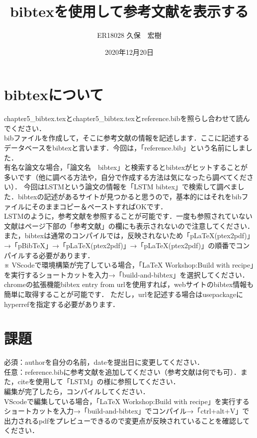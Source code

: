\documentclass[a4paper,10pt]{jsarticle}
\title{bibtexを使用して参考文献を表示する}%
\author{ER18028 久保　宏樹}%
\date{2020年12月20日}%
\begin{document}
\maketitle%
\section{bibtexについて}
chapter5\_bibtex.texとchapter5\_bibtex.texとreference.bibを照らし合わせて読んでください．\\

bibファイルを作成して，そこに参考文献の情報を記述します．ここに記述するデータベースをbibtexと言います．今回は，「reference.bib」という名前にしました．\\
有名な論文な場合，「論文名　bibtex」と検索するとbibtexがヒットすることが多いです（他に調べる方法や，自分で作成する方法は気になったら調べてください）．
今回はLSTMという論文の情報を「LSTM bibtex」で検索して調べました．bibtexの記述があるサイトが見つかると思うので，基本的にはそれをbibファイルにそのままコピー＆ペーストすればOKです．\\

LSTM\cite{LSTM}のように，参考文献を参照することが可能です．一度も参照されていない文献はページ下部の「参考文献」の欄にも表示されないので注意してください．
また，bibtexは通常のコンパイルでは，反映されないため「pLaTeX(ptex2pdf)」→「pBibTeX」→「pLaTeX(ptex2pdf)」→「pLaTeX(ptex2pdf)」の順番でコンパイルする必要があります．\\
※ VScodeで環境構築が完了している場合，「LaTeX Workshop:Build with recipe」を実行するショートカットを入力→「build-and-bibtex」を選択してください．\\

chromeの拡張機能bibtex entry from url\cite{bibtex_url}を使用すれば，webサイトのbibtex情報も簡単に取得することが可能です．
ただし，urlを記述する場合はusepackageにhyperrefを指定する必要があります．
\section{課題}
\noindent 必須：authorを自分の名前，dateを提出日に変更してください．\\
任意：reference.bibに参考文献を追加してください（参考文献は何でも可）．また，citeを使用して「LSTM\cite{LSTM}」の様に参照してください．\\

\noindent 編集が完了したら，コンパイルしてください．\\
VScodeで編集している場合，「LaTeX Workshop:Build with recipe」を実行するショートカットを入力→「build-and-bibtex」でコンパイル→「ctrl+alt+V」で出力されるpdfをプレビューできるので変更点が反映されていることを確認してください．
\end{document}
